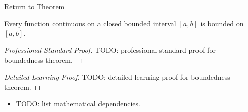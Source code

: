 \newpage
{}
\label{prf:boundedness-theorem}

\begin{remark*}[Return]
\hyperref[thm:boundedness-theorem]{Return to Theorem}
\end{remark*}

\begin{theorem*}
Every function continuous on a closed bounded interval $[a,b]$ is bounded on $[a,b]$.
\end{theorem*}

\begin{proof}[Professional Standard Proof]
\LRAProofBodyStart
TODO: professional standard proof for boundedness-theorem.
\end{proof}

\begin{proof}[Detailed Learning Proof]
\LRAProofBodyStart
TODO: detailed learning proof for boundedness-theorem.
\end{proof}

\begin{remark*}
\end{remark*}

\begin{dependencies}
\begin{itemize}
  \item TODO: list mathematical dependencies.
\end{itemize}
\end{dependencies}

\clearpage
